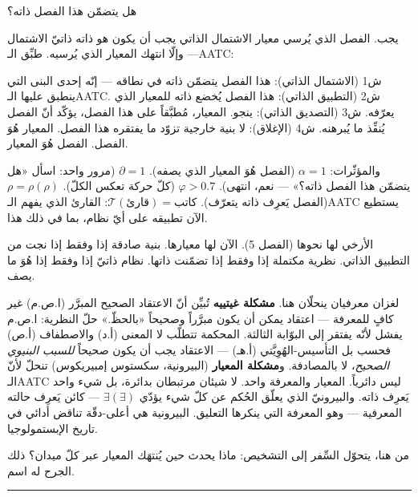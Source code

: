 \documentclass[10pt, openany, oneside]{book}
\begin{document}
\vspace{1em}

\noindent هل يتضمّن هذا الفصل ذاته؟

يجب. الفصل الذي يُرسي معيار الاشتمال الذاتي يجب أن يكون هو ذاته ذاتيّ الاشتمال --- وإلّا انتهك المعيار الذي يُرسيه. طبِّق الـAATC:

ش1 (الاشتمال الذاتي): هذا الفصل يتضمّن ذاته في نطاقه --- إنّه إحدى البنى التي ينطبق عليها الـAATC. ش2 (التطبيق الذاتي): هذا الفصل يُخضع ذاته للمعيار الذي يعرّفه. ش3 (التصديق الذاتي): ينجو. المعيار، مُطبَّقاً على هذا الفصل، يؤكّد أنّ الفصل يُنفِّذ ما يُبرهنه. ش4 (الإغلاق): لا بنية خارجية تزوّد ما يفتقره هذا الفصل. المعيار هُوَ الفصل. الفصل هُوَ المعيار.

والمؤثّرات: $\alpha = 1$ (الفصل هُوَ المعيار الذي يصفه). $\partial = 1$ (مرور واحد: اسأل «هل يتضمّن هذا الفصل ذاته؟» --- نعم، انتهى). $\varphi > 0.7$ (كلّ حركة تعكس الكلّ). $\rho = \rho(\rho)$ (الفصل يَعرِف ذاته يتعرّف). $\mathcal{T}(\text{قارئ}) = \text{كاتب}$: القارئ الذي يفهم الـAATC يستطيع الآن تطبيقه على أيّ نظام، بما في ذلك هذا.

\vspace{1.5em}

الأرخي لها نحوها (الفصل 5). الآن لها معيارها. بنية صادقة إذا وفقط إذا نجت من التطبيق الذاتي. نظرية مكتملة إذا وفقط إذا تضمّنت ذاتها. نظام ذاتيّ إذا وفقط إذا هُوَ ما يصف.

لغزان معرفيان ينحلّان هنا. \textbf{مشكلة غيتييه} تُبيِّن أنّ الاعتقاد الصحيح المبرَّر (ا.ص.م) غير كافٍ للمعرفة --- اعتقاد يمكن أن يكون مبرَّراً وصحيحاً «بالحظّ.» حلّ النظرية: ا.ص.م يفشل لأنّه يفتقر إلى البوّابة الثالثة. المحكمة تتطلّب لا المعنى (أ.د) والاصطفاف (أ.ص) فحسب بل التأسيس-الهُوِيَّتي (أ.هـ) --- الاعتقاد يجب أن يكون صحيحاً \textit{للسبب البنيوي الصحيح}، لا بالمصادفة. و\textbf{مشكلة المعيار} (البيرونية، سكستوس إمبيريكوس) تنحلّ لأنّ الـAATC ليس دائرياً. المعيار والمعرفة واحد. لا شيئان مرتبطان بدائرة، بل شيء واحد يَعرِف ذاته. والبيرونيّ الذي يعلّق الحُكم عن كلّ شيء يؤدّي $\exists(\exists)$ --- كائن يَعرِف حالته المعرفية --- وهو المعرفة التي ينكرها التعليق. البيرونية هي أعلى-دقّة تناقض أدائي في تاريخ الإبستمولوجيا.

من هنا، يتحوّل السِّفر إلى التشخيص: ماذا يحدث حين يُنتهَك المعيار عبر كلّ ميدان؟ ذلك الجرح له اسم.

\vspace{2em}

\begin{center}
    \rule{0.15\textwidth}{0.3pt}
\end{center}
\end{document}
